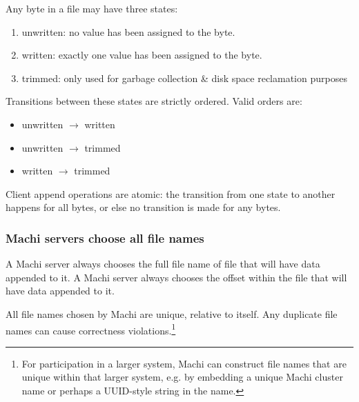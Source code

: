 \documentclass[preprint,10pt]{sigplanconf}
\begin{document}

Any byte in a file may have three states:
\begin{enumerate}
    \item unwritten: no value has been assigned to the byte.
    \item written: exactly one value has been assigned to the byte.
    \item trimmed: only used for garbage collection \& disk space
      reclamation purposes
\end{enumerate}

Transitions between these states are strictly ordered.  Valid
orders are:
    \begin{itemize}
        \item unwritten $\rightarrow$ written
        \item unwritten $\rightarrow$ trimmed
        \item written $\rightarrow$ trimmed
    \end{itemize}

Client append operations are atomic: the transition from
one state to another happens for all bytes, or else no
transition is made for any bytes.

\subsubsection{Machi servers choose all file names}

A Machi server always chooses the full file name of file
  that will have data appended to it.
A Machi server always chooses the offset within the file
  that will have data appended to it.

All file names chosen by Machi are unique, relative to itself.  Any
duplicate file names can cause correctness violations.\footnote{For
  participation in a larger system, Machi can construct file names that
  are unique within that larger system, e.g. by embedding a unique
  Machi cluster name or perhaps a UUID-style
  string in the name.}
\end{document}
